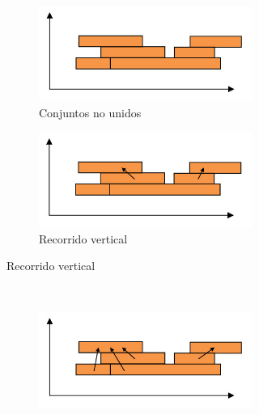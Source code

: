 \begin{figure}
	\centering
	\begin{subfigure}{\linewidth}
		\centering
		\begin{subfigure}{0.4\linewidth}
			\includegraphics[width=\linewidth]{../Images/c2/RLE1}
			\caption{Conjuntos no unidos}
			\label{fig:RLE1}
		\end{subfigure}
		\begin{subfigure}{0.4\linewidth}
			\includegraphics[width=\linewidth]{../Images/c2/RLE2}
			\caption{Recorrido vertical}
			\label{fig:RLE2}
		\end{subfigure}
	\end{subfigure}
	~
	\begin{subfigure}{\linewidth}
		\centering
   		\begin{subfigure}{0.4\linewidth}
   			\includegraphics[width=\linewidth]{../Images/c2/RLE3}

\end{subfigure}
\end{subfigure}
\end{figure}
